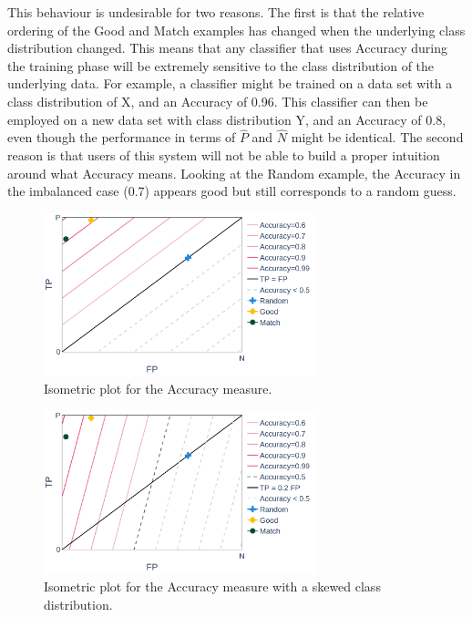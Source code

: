 This behaviour is undesirable for two reasons. The first is that the relative ordering of the Good and Match examples has changed when the underlying class distribution changed. This means that any classifier that uses Accuracy during the training phase will be extremely sensitive to the class distribution of the underlying data. For example, a classifier might be trained on a data set with a class distribution of X, and an Accuracy of 0.96. This classifier can then be employed on a new data set with class distribution Y, and an Accuracy of 0.8, even though the performance in terms of $\hat P$ and $\hat N$ might be identical. The second reason is that users of this system will not be able to build a proper intuition around what Accuracy means. Looking at the Random example, the Accuracy in the imbalanced case (0.7) appears good but still corresponds to a random guess.


\begin{figure}[ht]
    \centering
    \includegraphics[width=0.7\textwidth]{Figures/MP-Accuracy}
		\caption{Isometric plot for the Accuracy measure.}
    \label{fig:accuracy}
\end{figure}
\begin{figure}[ht]
    \centering
    \includegraphics[width=0.7\textwidth]{Figures/MP-Accuracy-bias}
		\caption{Isometric plot for the Accuracy measure with a skewed class distribution.}
    \label{fig:accuracy-bias}
\end{figure}

